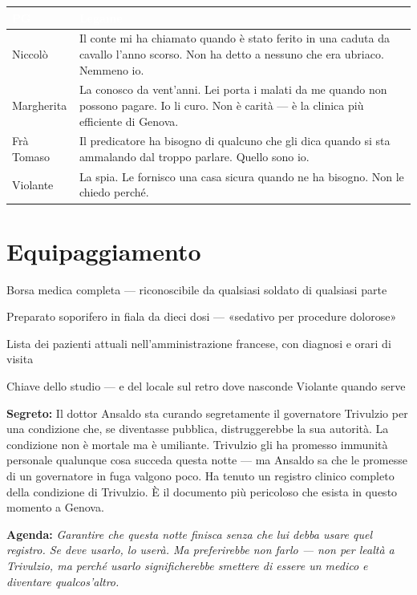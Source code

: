 \begin{table}[h]
\centering\renewcommand{\arraystretch}{1.4}
\begin{tabularx}{\linewidth}{@{}L{2.6cm} X@{}}
  \toprule{}
  \textcolor{white}{\textbf{PG}} & \textcolor{white}{\textbf{Legame}} \\
  \midrule
  Niccolò & Il conte mi ha chiamato quando è stato ferito in una caduta da cavallo l'anno scorso. Non ha detto a nessuno che era ubriaco. Nemmeno io. \\
  Margherita & La conosco da vent'anni. Lei porta i malati da me quando non possono pagare. Io li curo. Non è carità — è la clinica più efficiente di Genova. \\
  Frà Tomaso & Il predicatore ha bisogno di qualcuno che gli dica quando si sta ammalando dal troppo parlare. Quello sono io. \\
  Violante & La spia. Le fornisco una casa sicura quando ne ha bisogno. Non le chiedo perché. \\
  \bottomrule
\end{tabularx}
\end{table}

\section*{Equipaggiamento}
\begin{goldlist}
  \item Borsa medica completa — riconoscibile da qualsiasi soldato di qualsiasi parte
  \item Preparato soporifero in fiala da dieci dosi — «sedativo per procedure dolorose»
  \item Lista dei pazienti attuali nell'amministrazione francese, con diagnosi e orari di visita
  \item Chiave dello studio — e del locale sul retro dove nasconde Violante quando serve
\end{goldlist}


\begin{secretbox}
  \textbf{Segreto:} Il dottor Ansaldo sta curando segretamente il governatore
  Trivulzio per una condizione che, se diventasse pubblica, distruggerebbe
  la sua autorità. La condizione non è mortale ma è umiliante. Trivulzio
  gli ha promesso immunità personale qualunque cosa succeda questa notte —
  ma Ansaldo sa che le promesse di un governatore in fuga valgono poco.
  Ha tenuto un registro clinico completo della condizione di Trivulzio.
  È il documento più pericoloso che esista in questo momento a Genova.

  \medskip\noindent\textcolor{SecretRed}{\textbf{Agenda:}}
  \textit{Garantire che questa notte finisca senza che lui debba usare
  quel registro. Se deve usarlo, lo userà. Ma preferirebbe non farlo —
  non per lealtà a Trivulzio, ma perché usarlo significherebbe smettere
  di essere un medico e diventare qualcos'altro.}
\end{secretbox}

